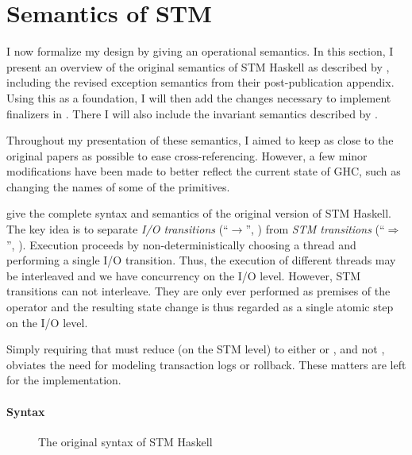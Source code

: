 \section{Semantics of STM}
\label{sec:stm-orig-semantics}

I now formalize my design by giving an operational semantics.
In this section, I present an overview of the original semantics of STM Haskell as described by \textcite{harris-et-al-2005}, including the revised exception semantics from their post-publication appendix.
Using this as a foundation, I will then add the changes necessary to implement finalizers in .
There I will also include the invariant semantics described by \textcite{harris-peytonjones-2006}.

Throughout my presentation of these semantics, I aimed to keep as close to the original papers as possible to ease cross-referencing.
However, a few minor modifications have been made to better reflect the current state of GHC, such as changing the names of some of the primitives.

\bigskip
{} give the complete syntax and semantics of the original version of STM Haskell.
The key idea is to separate \emph{I/O transitions} (``$\rightarrow$'', ) from \emph{STM transitions} (``$\Rightarrow$'', ).
Execution proceeds by non-deterministically choosing a thread and performing a single I/O transition.
Thus, the execution of different threads may be interleaved and we have concurrency on the I/O level.
However, STM transitions can not interleave.
They are only ever performed as premises of the  operator and the resulting state change is thus regarded as a single atomic step on the I/O level.

Simply requiring that  must reduce (on the STM level) to either  or , and not , obviates the need for modeling transaction logs or rollback.
These matters are left for the implementation.

\paragraph{Syntax}

\begin{figure}

\caption{The original syntax of STM Haskell \parencite{harris-et-al-2005}}
\label{fig:orig-syntax}
\end{figure}

